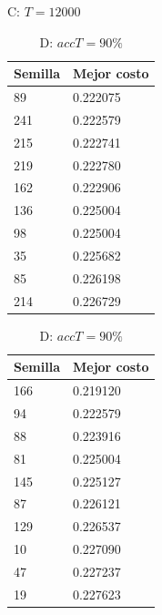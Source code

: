 \documentclass{article}
\begin{document}
\begin{table}[!htb]
    \begin{minipage}{.5\linewidth}
      \centering
        \caption{C: $T = 12000$}
        \begin{tabular}{l|l}
          Semilla & Mejor costo \\
          \hline
          89      & 0.222075 \\
          \hline
          241     & 0.222579 \\
          \hline
          215     & 0.222741 \\
          \hline
          219     & 0.222780 \\
          \hline
          162     & 0.222906 \\
          \hline
          136     & 0.225004 \\
          \hline
          98      & 0.225004 \\
          \hline
          35      & 0.225682 \\
          \hline
          85      & 0.226198 \\
          \hline
          214     & 0.226729 \\
        \end{tabular}
    \end{minipage}
    \begin{minipage}{.5\linewidth}
      \centering
        \caption{D: $accT = 90 \%$}
        \begin{tabular}{l|l}
            Semilla & Mejor costo \\
            \hline
            166     & 0.219120 \\
            \hline
            94      & 0.222579 \\
            \hline
            88      & 0.223916 \\
            \hline
            81      & 0.225004 \\
            \hline
            145     & 0.225127 \\
            \hline
            87      & 0.226121 \\
            \hline
            129     & 0.226537 \\
            \hline
            10      & 0.227090 \\
            \hline
            47      & 0.227237 \\
            \hline
            19      & 0.227623 \\
        \end{tabular}
    \end{minipage}

\end{table}
\end{document}
